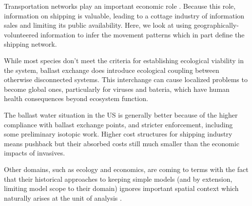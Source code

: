 Transportation networks play an important economic role \citep{canning1993effects}. Because this role, information on shipping is valuable, leading to a cottage industry of information sales and limiting its public availability. Here, we look at using geographically-volunteered information to infer the movement patterns which in part define the shipping network.




While most species don't meet the criteria for establishing ecological viability in the system, ballast exchange does introduce ecological coupling between otherwise disconnected systems. This interchange can cause localized problems to become global ones, particularly for viruses and bateria, which have human health consequences beyond ecosystem function. 

The ballast water situation in the US is generally better because of the higher compliance with ballast exchange points, and stricter enforcement, including some preliminary isotopic work. Higher cost structures for shipping industry means pushback but their absorbed costs still much smaller than the economic impacts of invasives.

Other domains, such as ecology and economics, are coming to terms with the fact that their historical approaches to keeping simple models (and by extension, limiting model scope to their domain) ignores important spatial context which naturally arises at the unit of analysis \citep{tilman1997,krugman1991geography}.


